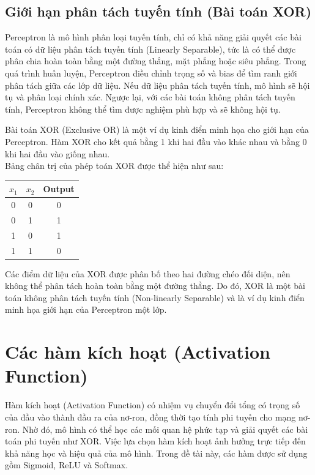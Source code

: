 \documentclass[12pt,a4paper]{report}
\begin{document}
\subsection{Giới hạn phân tách tuyến tính (Bài toán XOR)}
Perceptron là mô hình phân loại tuyến tính, chỉ có khả năng giải quyết các bài toán có dữ liệu phân tách tuyến tính (Linearly Separable), tức là có thể được phân chia hoàn toàn bằng một đường thẳng, mặt phẳng hoặc siêu phẳng. Trong quá trình huấn luyện, Perceptron điều chỉnh trọng số và bias để tìm ranh giới phân tách giữa các lớp dữ liệu. Nếu dữ liệu phân tách tuyến tính, mô hình sẽ hội tụ và phân loại chính xác. Ngược lại, với các bài toán không phân tách tuyến tính, Perceptron không thể tìm được nghiệm phù hợp và sẽ không hội tụ.

Bài toán XOR (Exclusive OR) là một ví dụ kinh điển minh họa cho giới hạn của Perceptron. Hàm XOR cho kết quả bằng 1 khi hai đầu vào khác nhau và bằng 0 khi hai đầu vào giống nhau. \\
Bảng chân trị của phép toán XOR được thể hiện như sau:

\begin{table}[H]
\centering
\begin{tabular}{|c|c|c|}
\hline
$x_1$ & $x_2$ & Output \\
\hline
0 & 0 & 0 \\
0 & 1 & 1 \\
1 & 0 & 1 \\
1 & 1 & 0 \\
\hline
\end{tabular}
\end{table}

Các điểm dữ liệu của XOR được phân bố theo hai đường chéo đối diện, nên không thể phân tách hoàn toàn bằng một đường thẳng. Do đó, XOR là một bài toán không phân tách tuyến tính (Non-linearly Separable) và là ví dụ kinh điển minh họa giới hạn của Perceptron một lớp.

\section{Các hàm kích hoạt (Activation Function)}
Hàm kích hoạt (Activation Function) có nhiệm vụ chuyển đổi tổng có trọng số của đầu vào thành đầu ra của nơ-ron, đồng thời tạo tính phi tuyến cho mạng nơ-ron. Nhờ đó, mô hình có thể học các mối quan hệ phức tạp và giải quyết các bài toán phi tuyến như XOR. Việc lựa chọn hàm kích hoạt ảnh hưởng trực tiếp đến khả năng học và hiệu quả của mô hình. Trong đề tài này, các hàm được sử dụng gồm Sigmoid, ReLU và Softmax.
\end{document}
